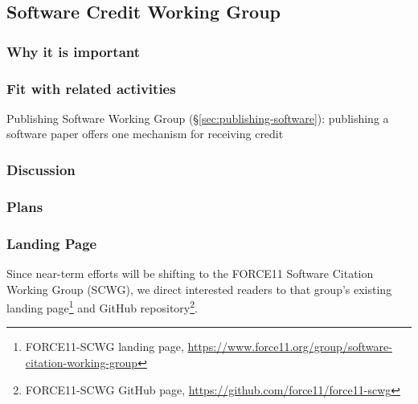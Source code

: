 \subsection{Software Credit Working Group}
\label{sec:software-credit}

\subsubsection{Why it is important}

\subsubsection{Fit with related activities}

Publishing Software Working Group (\S\ref{sec:publishing-software}): publishing a software paper offers one mechanism for receiving credit

\subsubsection{Discussion}

\subsubsection{Plans}

\subsubsection{Landing Page}

Since near-term efforts will be shifting to the FORCE11 Software Citation Working Group (SCWG), we direct interested readers to that group's existing landing page\footnote{FORCE11-SCWG landing page, \url{https://www.force11.org/group/software-citation-working-group}} and GitHub repository\footnote{FORCE11-SCWG GitHub page,  \url{https://github.com/force11/force11-scwg}}.